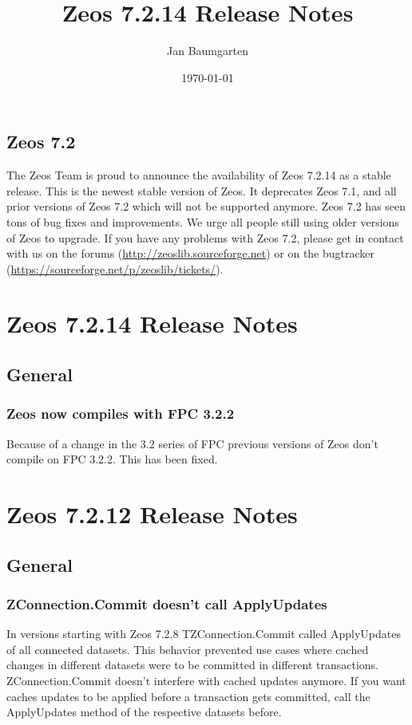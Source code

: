 \documentclass[a4paper,12pt,oneside]{book}
\title{Zeos 7.2.14 Release Notes}
\author{Jan Baumgarten}
\date{\today}
\begin{document}
\maketitle
\tableofcontents

\section*{Zeos 7.2}
The Zeos Team is proud to announce the availability of Zeos 7.2.14 as a stable release.
This is the newest stable version of Zeos.
It deprecates Zeos 7.1, and all prior versions of Zeos 7.2 which will not be supported anymore.
Zeos 7.2 has seen tons of bug fixes and improvements.
We urge all people still using older versions of Zeos to upgrade.
If you have any problems with Zeos 7.2, please get in contact with us on the forums (\url{http://zeoslib.sourceforge.net}) or on the bugtracker (\url{https://sourceforge.net/p/zeoslib/tickets/}).

\chapter{Zeos 7.2.14 Release Notes}

\section{General}
\subsection{Zeos now compiles with FPC 3.2.2}
Because of a change in the 3.2 series of FPC previous versions of Zeos don't compile on FPC 3.2.2.
This has been fixed.

\chapter{Zeos 7.2.12 Release Notes}

\section{General}
\subsection{ZConnection.Commit doesn't call ApplyUpdates}
In versions starting with Zeos 7.2.8 TZConnection.Commit called ApplyUpdates of all connected datasets.
This behavior prevented use cases where cached changes in different datasets were to be committed in different transactions.
ZConnection.Commit doesn't interfere with cached updates anymore.
If you want caches updates to be applied before a transaction gets committed, call the ApplyUpdates method of the respective datasets before.
\end{document}
